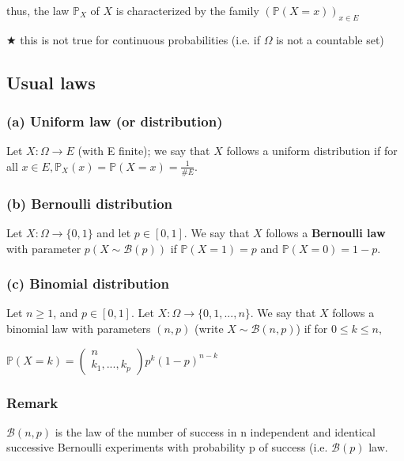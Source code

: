                 \noindent thus, the law $\mathbb{P}_X$ of $X$ is characterized by the family $(\mathbb{P}(X=x))_{x\in E}$

                \vspace{5pt}

                \noindent$\bigstar$ this is not true for continuous probabilities (i.e. if $\Omega$ is not a countable set)

        \subsection{Usual laws}
            \subsubsection{(a) Uniform law (or distribution)}
                Let $X:\Omega\rightarrow E$ (with E finite); we say that $X$ follows a uniform distribution if for all $x\in E, \mathbb{P}_X(x)=\mathbb{P}(X=x)=\frac{1}{\# E}$.

            \subsubsection{(b) Bernoulli distribution}
                Let $X: \Omega \rightarrow \{0,1\}$ and let $p \in [0,1]$. We say that $X$ follows a \textbf{Bernoulli law} with parameter $p (X \sim \mathcal{B}(p))$ if $\mathbb{P}(X=1)=p$ and $\mathbb{P}(X=0)=1-p$.

            \vspace{20pt}

            \subsubsection{(c) Binomial distribution}
                Let $n\geq 1$, and $p\in [0,1]$. Let $X:\Omega \rightarrow \{0,1,...,n\}$. We say that $X$ follows a binomial law with parameters $(n,p)$ (write $X\sim \mathcal{B}(n,p)$) if for $0\leq k\leq n,$

                \vspace{5pt}

                \centerline{$\mathbb{P}(X=k)=\left(\begin{array}{c} n \\ k_1,...,k_p \end{array}\right) p^k (1-p)^{n-k}$}

            \subsubsection{Remark}
                $\mathcal{B}(n,p)$ is the law of the number of success in n independent and identical successive Bernoulli experiments with probability p of success (i.e. $\mathcal{B}(p)$ law.

